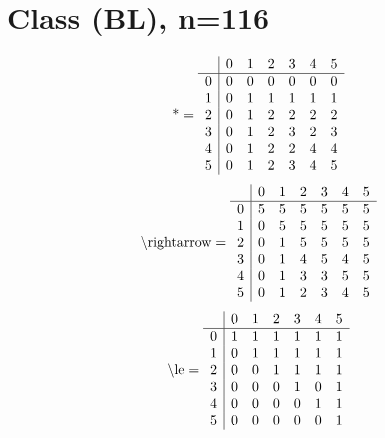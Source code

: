 \documentclass[11pt]{article}
\begin{document}
\section{Class (BL), n=116}
\[\text{*} = 
\begin{array}{r | r r r r r r}
 & 0 & 1 & 2 & 3 & 4 & 5 \\ \hline
0 & 0 & 0 & 0 & 0 & 0 & 0 \\
1 & 0 & 1 & 1 & 1 & 1 & 1 \\
2 & 0 & 1 & 2 & 2 & 2 & 2 \\
3 & 0 & 1 & 2 & 3 & 2 & 3 \\
4 & 0 & 1 & 2 & 2 & 4 & 4 \\
5 & 0 & 1 & 2 & 3 & 4 & 5 \\
\end{array}
\]
\[\text{\textbackslash rightarrow} = 
\begin{array}{r | r r r r r r}
 & 0 & 1 & 2 & 3 & 4 & 5 \\ \hline
0 & 5 & 5 & 5 & 5 & 5 & 5 \\
1 & 0 & 5 & 5 & 5 & 5 & 5 \\
2 & 0 & 1 & 5 & 5 & 5 & 5 \\
3 & 0 & 1 & 4 & 5 & 4 & 5 \\
4 & 0 & 1 & 3 & 3 & 5 & 5 \\
5 & 0 & 1 & 2 & 3 & 4 & 5 \\
\end{array}
\]
\[\text{\textbackslash le} = 
\begin{array}{r | r r r r r r}
 & 0 & 1 & 2 & 3 & 4 & 5 \\ \hline
0 & 1 & 1 & 1 & 1 & 1 & 1 \\
1 & 0 & 1 & 1 & 1 & 1 & 1 \\
2 & 0 & 0 & 1 & 1 & 1 & 1 \\
3 & 0 & 0 & 0 & 1 & 0 & 1 \\
4 & 0 & 0 & 0 & 0 & 1 & 1 \\
5 & 0 & 0 & 0 & 0 & 0 & 1 \\
\end{array}
\]
\end{document}
